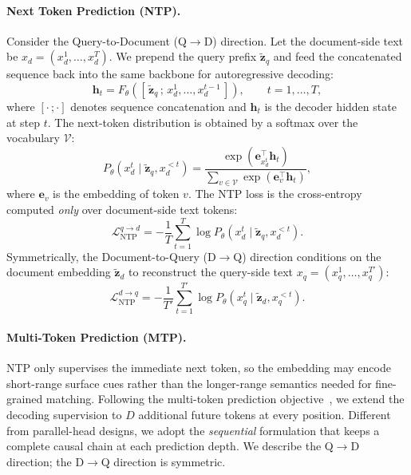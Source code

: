 \paragraph{Next Token Prediction (NTP).}
Consider the Query-to-Document (Q$\rightarrow$D) direction. Let the document-side text be $x_d=(x_d^1,\dots,x_d^T)$. We prepend the query prefix $\tilde{\mathbf{z}}_q$ and feed the concatenated sequence back into the same backbone for autoregressive decoding:
\begin{equation}
\mathbf{h}_t = F_\theta\!\left([\,\tilde{\mathbf{z}}_q\,;\,
x_d^{1},\dots,x_d^{t-1}\,]\right),
\qquad t=1,\dots,T,
\label{eq:s2b-decode-hidden}
\end{equation}
where $[\cdot\,;\cdot]$ denotes sequence concatenation and $\mathbf{h}_t$ is the decoder hidden state at step $t$. The next-token distribution is obtained by a softmax over the vocabulary $\mathcal{V}$:
\begin{equation}
P_\theta\!\left(x_d^{t}\mid \tilde{\mathbf{z}}_q, x_d^{<t}\right)
= \frac{\exp\!\left(\mathbf{e}_{x_d^{t}}^{\top}\mathbf{h}_t\right)}
{\sum_{v\in\mathcal{V}}\exp\!\left(\mathbf{e}_{v}^{\top}\mathbf{h}_t\right)},
\label{eq:s2b-softmax}
\end{equation}
where $\mathbf{e}_v$ is the embedding of token $v$. The NTP loss is the cross-entropy computed \emph{only} over document-side text tokens:
\begin{equation}
\mathcal{L}_{\text{NTP}}^{q\rightarrow d}
= -\frac{1}{T}\sum_{t=1}^{T}
\log P_\theta\!\left(x_d^{t}\mid \tilde{\mathbf{z}}_q, x_d^{<t}\right).
\label{eq:s2b-ntp-q2d}
\end{equation}
Symmetrically, the Document-to-Query (D$\rightarrow$Q) direction conditions on the document embedding $\tilde{\mathbf{z}}_d$ to reconstruct the query-side text $x_q=(x_q^1,\dots,x_q^{T'})$:
\begin{equation}
\mathcal{L}_{\text{NTP}}^{d\rightarrow q}
= -\frac{1}{T'}\sum_{t=1}^{T'}
\log P_\theta\!\left(x_q^{t}\mid \tilde{\mathbf{z}}_d, x_q^{<t}\right).
\label{eq:s2b-ntp-d2q}
\end{equation}

\paragraph{Multi-Token Prediction (MTP).}
NTP only supervises the immediate next token, so the embedding may encode short-range surface cues rather than the longer-range semantics needed for fine-grained matching. Following the multi-token prediction objective~\cite{MultiTokenPrediction,DeepSeekV3}, we extend the decoding supervision to $D$ additional future tokens at every position. Different from parallel-head designs, we adopt the \emph{sequential} formulation that keeps a complete causal chain at each prediction depth. We describe the Q$\rightarrow$D direction; the D$\rightarrow$Q direction is symmetric.

